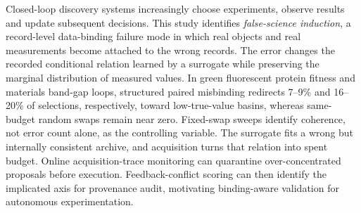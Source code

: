 Closed-loop discovery systems increasingly choose experiments, observe results and update subsequent decisions. This study identifies \emph{false-science induction}, a record-level data-binding failure mode in which real objects and real measurements become attached to the wrong records. The error changes the recorded conditional relation learned by a surrogate while preserving the marginal distribution of measured values. In green fluorescent protein fitness and materials band-gap loops, structured paired misbinding redirects 7--9\% and 16--20\% of selections, respectively, toward low-true-value basins, whereas same-budget random swaps remain near zero. Fixed-swap sweeps identify coherence, not error count alone, as the controlling variable. The surrogate fits a wrong but internally consistent archive, and acquisition turns that relation into spent budget. Online acquisition-trace monitoring can quarantine over-concentrated proposals before execution. Feedback-conflict scoring can then identify the implicated axis for provenance audit, motivating binding-aware validation for autonomous experimentation.
